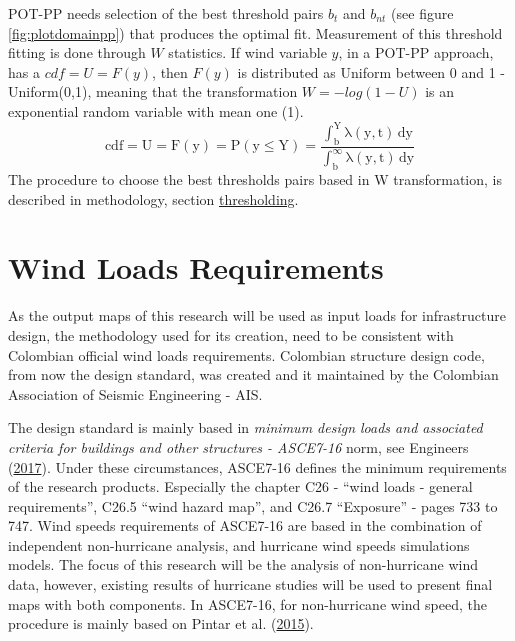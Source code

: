 \documentclass[12pt,oneside]{reedthesis}
\begin{document}
POT-PP needs selection of the best threshold pairs \(b_t\) and \(b_{nt}\) (see figure \ref{fig:plotdomainpp}) that produces the optimal fit. Measurement of this threshold fitting is done through \(W\) statistics. If wind variable \(y\), in a POT-PP approach, has a \(cdf = U = F(y)\), then \(F(y)\) is distributed as Uniform between 0 and 1 - Uniform(0,1), meaning that the transformation \(W = -log(1-U)\) is an exponential random variable with mean one (1).
\begin{equation}
  \mathrm{
            cdf = U= F(y) = P(y \leq Y) = \frac{\int_b^Y\lambda(y,t)\,dy}{\int_b^\infty\lambda(y,t)\,dy} 
         }
  \label{eq:ppcdf}
\end{equation}
The procedure to choose the best thresholds pairs based in W transformation, is described in methodology, section \protect\hyperlink{thresholding}{thresholding}.

\hypertarget{windloadsrequirements}{%
\section{Wind Loads Requirements}\label{windloadsrequirements}}

As the output maps of this research will be used as input loads for infrastructure design, the methodology used for its creation, need to be consistent with Colombian official wind loads requirements. Colombian structure design code, from now the design standard, was created and it maintained by the Colombian Association of Seismic Engineering - AIS.

The design standard is mainly based in \emph{minimum design loads and associated criteria for buildings and other structures - ASCE7-16} norm, see Engineers (\protect\hyperlink{ref-Asce2017}{2017}). Under these circumstances, ASCE7-16 defines the minimum requirements of the research products. Especially the chapter C26 - ``wind loads - general requirements'', C26.5 ``wind hazard map'', and C26.7 ``Exposure'' - pages 733 to 747. Wind speeds requirements of ASCE7-16 are based in the combination of independent non-hurricane analysis, and hurricane wind speeds simulations models. The focus of this research will be the analysis of non-hurricane wind data, however, existing results of hurricane studies will be used to present final maps with both components. In ASCE7-16, for non-hurricane wind speed, the procedure is mainly based on Pintar et al. (\protect\hyperlink{ref-Pintar2015}{2015}).
\end{document}

